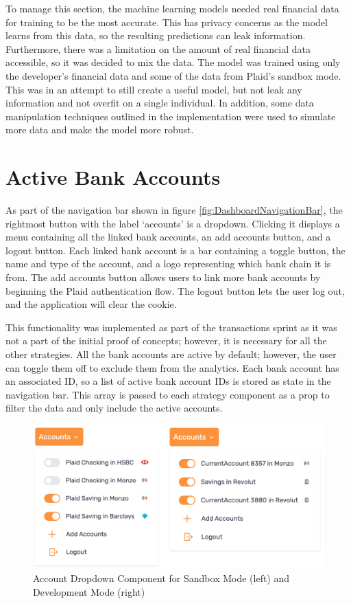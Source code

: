 To manage this section, the machine learning models needed real financial data for training to be the most accurate. This has privacy concerns as the model learns from this data, so the resulting predictions can leak information. Furthermore, there was a limitation on the amount of real financial data accessible, so it was decided to mix the data. The model was trained using only the developer's financial data and some of the data from Plaid's sandbox mode. This was in an attempt to still create a useful model, but not leak any information and not overfit on a single individual. In addition, some data manipulation techniques outlined in the implementation were used to simulate more data and make the model more robust.

\section{Active Bank Accounts}
As part of the navigation bar shown in figure \ref{fig:DashboardNavigationBar}, the rightmost button with the label `accounts' is a dropdown. Clicking it displays a menu containing all the linked bank accounts, an add accounts button, and a logout button. Each linked bank account is a bar containing a toggle button, the name and type of the account, and a logo representing which bank chain it is from. The add accounts button allows users to link more bank accounts by beginning the Plaid authentication flow. The logout button lets the user log out, and the application will clear the cookie.

This functionality was implemented as part of the transactions sprint as it was not a part of the initial proof of concepts; however, it is necessary for all the other strategies. All the bank accounts are active by default; however, the user can toggle them off to exclude them from the analytics. Each bank account has an associated ID, so a list of active bank account IDs is stored as state in the navigation bar. This array is passed to each strategy component as a prop to filter the data and only include the active accounts.

\begin{figure}[H]
	\centering
	\includegraphics[width=\textwidth]{images/accounts_dropdown.png}
	\caption{Account Dropdown Component for Sandbox Mode (left) and Development Mode (right)}
	\label{fig:AccountsDropdown}
\end{figure}

